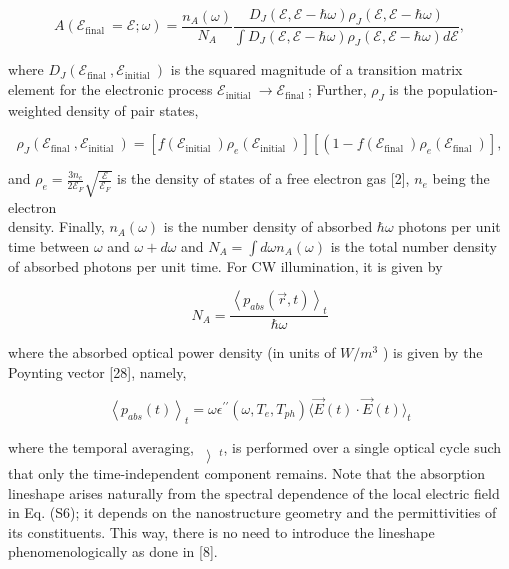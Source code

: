 \documentclass[10pt]{article}
\begin{document}
\begin{equation*}
A\left(\mathcal{E}_{\text {final }}=\mathcal{E} ; \omega\right)=\frac{n_{A}(\omega)}{N_{A}} \frac{D_{J}(\mathcal{E}, \mathcal{E}-\hbar \omega) \rho_{J}(\mathcal{E}, \mathcal{E}-\hbar \omega)}{\int D_{J}(\mathcal{E}, \mathcal{E}-\hbar \omega) \rho_{J}(\mathcal{E}, \mathcal{E}-\hbar \omega) d \mathcal{E}}, \tag{S3}
\end{equation*}


where $D_{J}\left(\mathcal{E}_{\text {final }}, \mathcal{E}_{\text {initial }}\right)$ is the squared magnitude of a transition matrix element for the electronic process $\mathcal{E}_{\text {initial }} \rightarrow \mathcal{E}_{\text {final }}$; Further, $\rho_{J}$ is the population-weighted density of pair states,


\begin{equation*}
\rho_{J}\left(\mathcal{E}_{\text {final }}, \mathcal{E}_{\text {initial }}\right)=\left[f\left(\mathcal{E}_{\text {initial }}\right) \rho_{e}\left(\mathcal{E}_{\text {initial }}\right)\right]\left[\left(1-f\left(\mathcal{E}_{\text {final }}\right) \rho_{e}\left(\mathcal{E}_{\text {final }}\right)\right],\right. \tag{S4}
\end{equation*}


and $\rho_{e}=\frac{3 n_{e}}{2 \mathcal{E}_{F}} \sqrt{\frac{\mathcal{E}}{\mathcal{E}_{F}}}$ is the density of states of a free electron gas [2], $n_{e}$ being the electron\\
density. Finally, $n_{A}(\omega)$ is the number density of absorbed $\hbar \omega$ photons per unit time between $\omega$ and $\omega+d \omega$ and $N_{A}=\int d \omega n_{A}(\omega)$ is the total number density of absorbed photons per unit time. For CW illumination, it is given by


\begin{equation*}
N_{A}=\frac{\left\langle p_{a b s}(\vec{r}, t)\right\rangle_{t}}{\hbar \omega} \tag{S5}
\end{equation*}


where the absorbed optical power density (in units of $W / m^{3}$ ) is given by the Poynting vector [28], namely,


\begin{equation*}
\left\langle p_{a b s}(t)\right\rangle_{t}=\omega \epsilon^{\prime \prime}\left(\omega, T_{e}, T_{p h}\right)\langle\vec{E}(t) \cdot \vec{E}(t)\rangle_{t} \tag{S6}
\end{equation*}


where the temporal averaging, $\left\rangle_{t}\right.$, is performed over a single optical cycle such that only the time-independent component remains. Note that the absorption lineshape arises naturally from the spectral dependence of the local electric field in Eq. (S6); it depends on the nanostructure geometry and the permittivities of its constituents. This way, there is no need to introduce the lineshape phenomenologically as done in [8].
\end{document}
